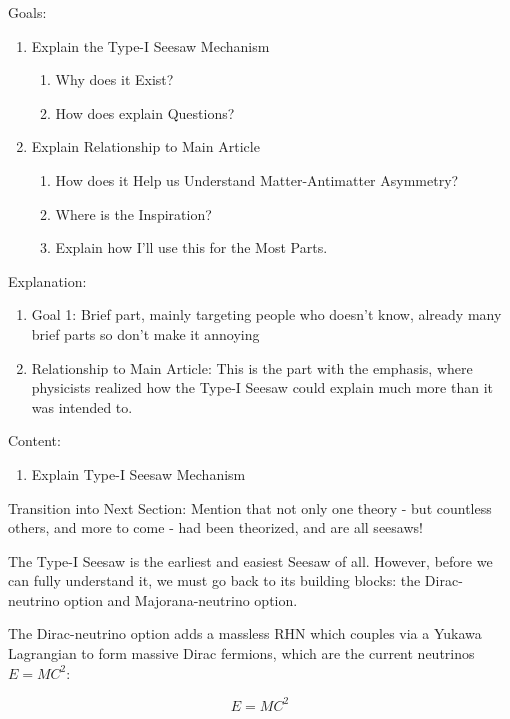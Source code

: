 \documentclass[a4paper,12pt]{article}
\begin{document}
Goals:
\begin{enumerate}
	\item Explain the Type-I Seesaw Mechanism
	\begin{enumerate}[label=\arabic*.] %
		\item Why does it Exist?
		\item How does explain Questions?
	\end{enumerate}
	\item Explain Relationship to Main Article
	\begin{enumerate}
		\item How does it Help us Understand Matter-Antimatter Asymmetry?
		\item Where is the Inspiration?
		\item Explain how I’ll use this for the Most Parts.
	\end{enumerate}
\end{enumerate}

Explanation:
\begin{enumerate}
	\item Goal 1: Brief part, mainly targeting people who doesn’t know, already many brief parts so don’t make it annoying
	\item Relationship to Main Article: This is the part with the emphasis, where physicists realized how the Type-I Seesaw could explain much more than it was intended to.
\end{enumerate}

Content:
\begin{enumerate}
	\item Explain Type-I Seesaw Mechanism
\end{enumerate}

Transition into Next Section: Mention that not only one theory - but countless others, and more to come - had been theorized, and are all seesaws!

The Type-I Seesaw is the earliest and easiest Seesaw of all. However, before we can fully understand it, we must go back to its building blocks: the Dirac-neutrino option and Majorana-neutrino option.

The Dirac-neutrino option adds a massless RHN which couples via a Yukawa Lagrangian to form massive Dirac fermions, which are the current neutrinos $E=MC^2$: %

$$ %
E=MC^2
$$
\end{document}
